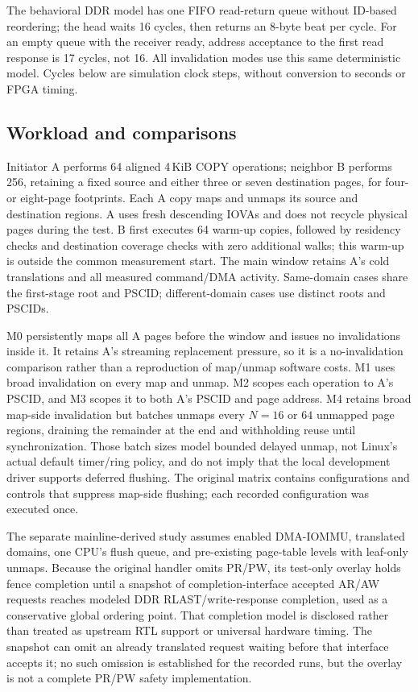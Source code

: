 \documentclass[sigconf,nonacm]{acmart}
\newcommand{\claim}[1]{} %
\begin{document}
The behavioral DDR model has one FIFO read-return queue without ID-based reordering; the head waits 16 cycles, then returns an 8-byte beat per cycle.\claim{C042}
For an empty queue with the receiver ready, address acceptance to the first read response is 17 cycles, not 16.\claim{C043}
All invalidation modes use this same deterministic model. Cycles below are simulation clock steps, without conversion to seconds or FPGA timing.\claim{C044}

\subsection{Workload and comparisons}
Initiator A performs 64 aligned 4\,KiB COPY operations; neighbor B performs 256, retaining a fixed source and either three or seven destination pages, for four- or eight-page footprints.\claim{C045}
Each A copy maps and unmaps its source and destination regions. A uses fresh descending IOVAs and does not recycle physical pages during the test.\claim{C046}
B first executes 64 warm-up copies, followed by residency checks and destination coverage checks with zero additional walks; this warm-up is outside the common measurement start.\claim{C047}
The main window retains A's cold translations and all measured command/DMA activity.\claim{C048}
Same-domain cases share the first-stage root and PSCID; different-domain cases use distinct roots and PSCIDs.\claim{C049}

M0 persistently maps all A pages before the window and issues no invalidations inside it. It retains A's streaming replacement pressure, so it is a no-invalidation comparison rather than a reproduction of map/unmap software costs.\claim{C050}
M1 uses broad invalidation on every map and unmap. M2 scopes each operation to A's PSCID, and M3 scopes it to both A's PSCID and page address.\claim{C051}
M4 retains broad map-side invalidation but batches unmaps every $N=16$ or $64$ unmapped page regions, draining the remainder at the end and withholding reuse until synchronization.\claim{C052}
Those batch sizes model bounded delayed unmap, not Linux's actual default timer/ring policy, and do not imply that the local development driver supports deferred flushing.\claim{C053}
The original matrix contains \MainCases{} configurations and \ControlCases{} controls that suppress map-side flushing; each recorded configuration was executed once.\claim{C054}

The separate mainline-derived study assumes enabled DMA-IOMMU, translated domains, one CPU's flush queue, and pre-existing page-table levels with leaf-only unmaps.\claim{N004}
Because the original handler omits PR/PW, its test-only overlay holds fence completion until a snapshot of completion-interface accepted AR/AW requests reaches modeled DDR RLAST/write-response completion, used as a conservative global ordering point.\claim{N005}
That completion model is disclosed rather than treated as upstream RTL support or universal hardware timing.\claim{N006}
The snapshot can omit an already translated request waiting before that interface accepts it; no such omission is established for the recorded runs, but the overlay is not a complete PR/PW safety implementation.\claim{N024}
\end{document}
